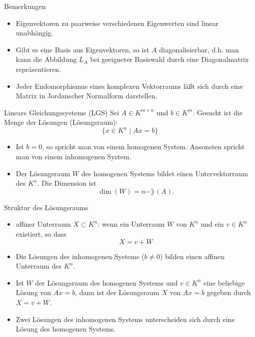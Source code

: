 \documentclass[hyperref={xetex}]{beamer}
\begin{document}
\begin{frame}{Bemerkungen}
\begin{itemize}
\item Eigenvektoren zu paarweise verschiedenen Eigenwerten  sind linear
unabhängig.
\item Gibt es eine Basis aus Eigenvektoren, so ist $A$
{\color{red} diagonalisierbar}, d.h. man kann die Abbildung $L_A$ bei
geeigneter Basiswahl durch eine Diagonalmatrix repräsentieren.
\item Jeder Endomorphismus eines komplexen Vektorraums läßt sich durch
eine Matrix in \alert{Jordanscher Normalform} darstellen.
\end{itemize}
\end{frame}


\begin{frame}{Lineare Gleichungssysteme (LGS)}
Sei $A\in K^{m \times n}$ und $b \in K^m$. Gesucht ist die Menge der
Lösungen (Lösungsraum): 
\[ \{ x \in K^n \;|\; A x = b\} \]
\begin{itemize}
\item Ist $b=0$, so spricht man von einem {\color{red} homogenen
System}. Ansonsten spricht man von einem {\color{red} inhomogenen System}.
\item Der Lösungsraum $W$ des homogenen Systems bildet einen
Untervektorraum des $K^n$. Die Dimension ist 
\[ \dim (W)=n - \rang(A). \] 
\end{itemize}
\end{frame}

\begin{frame}{Struktur des Lösungsraums}
\begin{itemize}
\item {\color{red} affiner Unterraum}  $X \subset K^n$: wenn ein
Unterraum $W$ von $K^n$ und ein $v \in K^n$ existiert, so dass 
\[X=v+W\]
\item Die Lösungen des inhomogenen Systems ($b \neq 0$) bilden einen affinen
Unterraum des $K^n$.   

\item Ist $W$ der Lösungsraum des homogenen Systems und $v \in K^n$
eine beliebige Lösung von $Ax=b$, dann ist der Lösungsraum $X$ von $Ax=b$
gegeben durch  $X=v+W$.
\item Zwei Lösungen des inhomogenen Systems unterscheiden sich durch
eine Lösung des homogenen Systems.
\end{itemize}
\end{frame}
\end{document}

